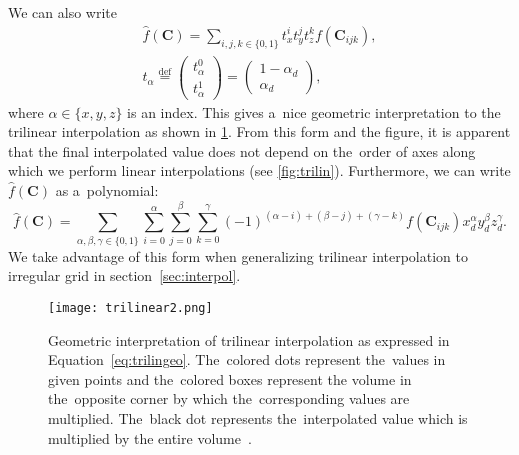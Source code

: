 				\noindent We can also write
					\begin{eqnarray}
						\label{eq:trilingeo}
						\widehat{f}(\mathbf{C}) = \sum_{i,j,k \in \{0,1\}} t_x^i t_y^j t_z^k f(\mathbf{C}_{ijk}),\\
						t_\alpha \stackrel{\text{def}}{=} \begin{pmatrix}t_\alpha^0\\ t_\alpha^1\end{pmatrix} = \begin{pmatrix}1-\alpha_d\\ \alpha_d\end{pmatrix},
					\end{eqnarray}
				where $\alpha \in \{x,y,z\}$ is an index. This gives a~nice geometric interpretation to the trilinear interpolation as shown in \cref{fig:trilin2}. From this form and the figure, it is apparent that the final interpolated value does not depend on the~order of axes along which we perform linear interpolations (see \cref{fig:trilin}). Furthermore, we can write $\widehat{f}(\mathbf{C})$ as a~polynomial:
					\begin{equation}
						\label{eq:trilinpoly}
						\widehat{f}(\mathbf{C}) = \sum_{\alpha,\beta,\gamma \in \{0,1\}}\sum^{\alpha}_{i=0}\sum^{\beta}_{j=0}\sum^{\gamma}_{k=0} 	(-1)^{(\alpha-i)+(\beta-j)+(\gamma-k)} f(\mathbf{C}_{ijk}) x_d^\alpha y_d^\beta z_d^\gamma.
					\end{equation}
				We take advantage of this form when generalizing trilinear interpolation to irregular grid in section~\ref{sec:interpol}.
					
				\begin{figure}
					\centering
					\texttt{[image: trilinear2.png]}
					\caption{Geometric interpretation of trilinear interpolation as expressed in Equation~\ref{eq:trilingeo}. The~colored dots represent the~values in given points and the~colored boxes represent the volume in the~opposite corner by which the~corresponding values are multiplied. The~black dot represents the~interpolated value which is multiplied by the entire volume~\cite{trilinear}.}
					\label{fig:trilin2}
				\end{figure}
				

